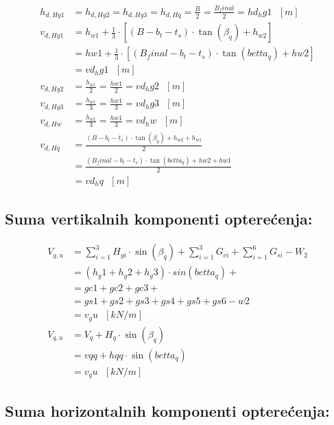 \documentclass[a4paper, 11pt]{article}
\begin{document}
\begin{align*}
h_{d,Hg1} &= h_{d,Hg2} = h_{d,Hg3} = h_{d,Hq}  = \frac{B}{2} = \frac{B_final}{2} = hd_hg1 \text{ } [m]\\
v_{d,Hg1} &= h_{w1} + \frac{1}{3} \cdot \left[(B - b_{t} - t_{s}) \cdot \tan(\beta_{q}) + h_{w2}\right] \\
         &= hw1 + \frac{1}{3} \cdot \left[(B_final - b_t - t_s) \cdot \tan(betta_q) + hw2 \right] \\
         &= vd_hg1 \text{ } [m] \\
v_{d,Hg2} &= \frac{h_{w1}}{2} = \frac{hw1}{2} =  vd_hg2 \text{ } [m] \\
v_{d,Hg3} &=  \frac{h_{w1}}{3} = \frac{hw1}{3} =  vd_hg3 \text{ } [m] \\
v_{d,Hw} &= \frac{h_{w1}}{3} = \frac{hw1}{3} =  vd_hw \text{ } [m] \\
v_{d,Hq} &= \frac{(B - b_{t} - t_{s}) \cdot \tan(\beta_{q}) + h_{w2} + h_{w1}}{2} \\
		&= \frac{(B_final - b_t - t_s) \cdot \tan(betta_q) + hw2 + hw1}{2} \\
		&= vd_hq \text{ } [m]
\end{align*}

\subsection*{Suma vertikalnih komponenti optere\'cenja:}

\begin{align*}
V_{g,u} &= \sum_{i=1}^{3} H_{gi} \cdot \sin(\beta_{q}) + \sum_{i=1}^3 {G_{ci}} + \sum_{i=1}^{6} {G_{si}} -W_{2} \\
		&= \left( h_g1 + h_g2 + h_g3 \right) \cdot sin(betta_q)+  \\
		&= gc1+gc2+gc3 + \\
		&= gs1+gs2+gs3+gs4+gs5+gs6 - w2 \\
		&= v_gu \text{ } [kN/m] \\
V_{q,u} &= V_{q} + H_{q} \cdot \sin(\beta_{q}) \\
		&= vqq + hqq \cdot \sin (betta_q) \\
		&= v_qu \text{ } [kN/m]
\end{align*}

\subsection*{Suma horizontalnih komponenti optere\'cenja:}
\end{document}
